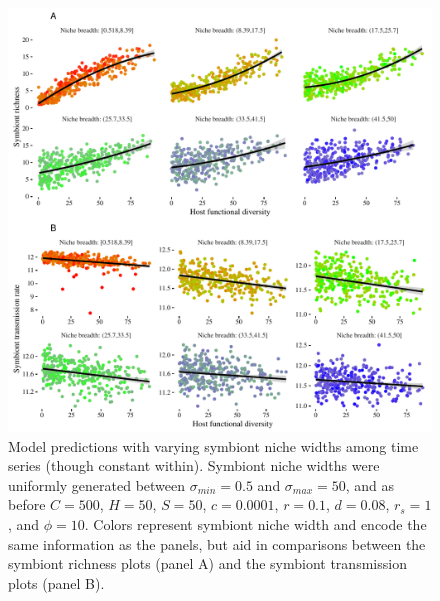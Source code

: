 \documentclass[12pt]{article}
\begin{document}
\newpage

\begin{figure}[ht]\centering
\includegraphics[width=\linewidth]{fig/fig2.pdf}
\caption{Model predictions with varying symbiont niche widths among time series (though constant within). Symbiont niche widths were uniformly generated between $\sigma_{min} = 0.5$ and $\sigma_{max} = 50$, and as before $C=500$, $H=50$, $S=50$, $c=0.0001$, $r=0.1$, $d=0.08$, $r_s=1$, and $\phi = 10$. Colors represent symbiont niche width and encode the same information as the panels, but aid in comparisons between the symbiont richness plots (panel A) and the symbiont transmission plots (panel B).}
\label{f3}
\end{figure}

\newpage
\end{document}
